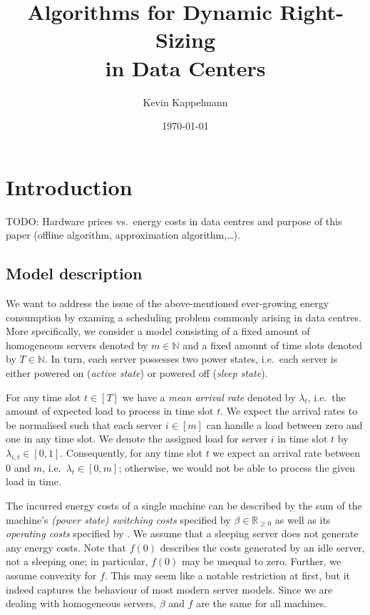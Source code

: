 \documentclass[hidelinks]{article}
\title{\textbf{Algorithms for Dynamic Right-Sizing\\in Data Centers}}
\author{Kevin Kappelmann}
\affil{Chair for Theoretical Computer Science,\\ Technical University of Munich}
\date{\today}
\theoremstyle{plain}
\theoremstyle{definition}
\theoremstyle{rem}
\begin{document}
\maketitle
\newpage
\tableofcontents 
\newpage


\section{Introduction}
TODO: Hardware prices vs.\ energy costs in data centres and purpose of this paper (offline algorithm, approximation algorithm,\ldots).

\subsection{Model description}\label{sec_model_descr}
We want to address the issue of the above-mentioned ever-growing energy consumption by examing a scheduling problem commonly arising in data centres. More specifically, we consider a model consisting of a fixed amount of homogeneous servers denoted by $m\in\mathbb{N}$ and a fixed amount of time slots denoted by $T\in\mathbb{N}$. In turn, each server possesses two power states, i.e.\ each server is either powered on (\textit{active state}) or powered off (\textit{sleep state}).
	
For any time slot $t\in[T]$ we have a \textit{mean arrival rate} denoted by $\lambda_t$, i.e.\ the amount of expected load to process in time slot $t$. We expect the arrival rates to be normalised such that each server $i\in[m]$ can handle a load between zero and one in any time slot. We denote the assigned load for server $i$ in time slot $t$ by $\lambda_{i,t}\in[0,1]$. Consequently, for any time slot $t$ we expect an arrival rate between $0$ and $m$, i.e.\ $\lambda_t\in[0,m]$; otherwise, we would not be able to process the given load in time.

The incurred energy costs of a single machine can be described by the sum of the machine's \textit{(power state) switching costs} specified by $\beta\in\mathbb{R}_{\ge 0}$ as well as its \textit{operating costs} specified by . We assume that a sleeping server does not generate any energy costs. Note that $f(0)$ describes the costs generated by an idle server, not a sleeping one; in particular, $f(0)$ may be unequal to zero. Further, we assume convexity for $f$. This may seem like a notable restriction at first, but it indeed captures the behaviour of most modern server models. Since we are dealing with homogeneous servers, $\beta$ and $f$ are the same for all machines.
\end{document}
